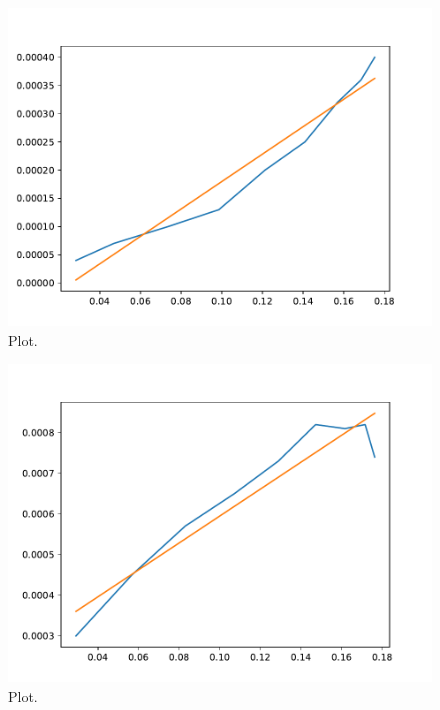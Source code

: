 



\begin{figure}
  \centering
  \includegraphics{./plots/Stange3a.pdf}
  \caption{Plot.}
  \label{fig:plot}
\end{figure}





\begin{figure}
  \centering
  \includegraphics{./plots/Stange3b.pdf}
  \caption{Plot.}
  \label{fig:plot}
\end{figure}

